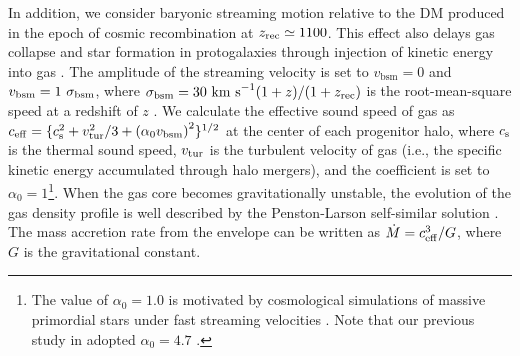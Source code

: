 \documentclass[twocolumn, twocolappendix]{aastex63}
\newcommand{\vbsm}{v_\mathrm{bsm}}
\begin{document}
\begin{CJK*}{UTF8}{gbsn}
In addition, we consider baryonic streaming motion relative to the DM produced in the epoch of cosmic recombination at $z_{\rm rec} \simeq 1100$.
This effect also delays gas collapse and star formation in protogalaxies through injection of kinetic energy into gas
\citep[e.g.,][]{2012MNRAS.424.1335F, 2014MNRAS.439.1092T, 2017Sci...357.1375H,2019MNRAS.484.3510S,2021ApJ...917...60L}.
The amplitude of the streaming velocity is set to $\vbsm = 0$ and $\vbsm=1~\sigma_{\rm bsm}$, where $\sigma_{\rm bsm}=30~{\rm km~s}^{-1} (1+z)/(1+z_{\rm rec})$
is the root-mean-square speed at a redshift of $z$ \citep{2010PhRvD..82h3520T}.
We calculate the effective sound speed of gas as $c_{\rm eff} = \{c_{\rm s}^2+v_{\rm tur}^2/3+\left(\alpha_0 \vbsm \right)^2 \}^{1/2}$ at the center of each progenitor halo,
where $c_{\rm s}$ is the thermal sound speed, $v_{\rm tur}$ is the turbulent velocity of gas (i.e., the specific kinetic energy accumulated through halo mergers), and
the coefficient is set to $\alpha_0=1$\footnote[1]{The value of $\alpha_0=1.0$ is motivated by cosmological simulations of massive primordial stars
under fast streaming velocities \citep{2017Sci...357.1375H,2019MNRAS.484.3510S}.
Note that our previous study in \citet{2021ApJ...917...60L} adopted $\alpha_0=4.7$ \citep{2018ApJ...855...17H}.}.
%
When the gas core becomes gravitationally unstable, the evolution of the gas density profile is well described by 
the Penston-Larson self-similar solution \citep{1969MNRAS.144..425P,1969MNRAS.145..271L}. 
The mass accretion rate from the envelope can be written as $\dot{M}=c_{\rm eff}^3/G$,
where $G$ is the gravitational constant.




\end{CJK*}
\end{document}
